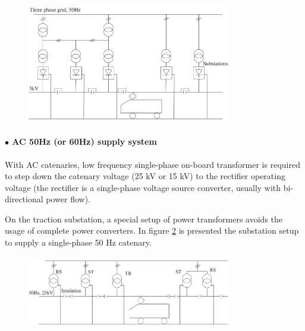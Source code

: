 \begin{figure}[h!]
	\centering
	\begin{minipage}{.7\textwidth}
		\centering
		\includegraphics[width=0.8\textwidth,keepaspectratio]{figures/31.PowerS/abad2016f}
		\label{fig:abad2016f}
	\end{minipage}
\end{figure}




\paragraph{$\bullet$ AC 50Hz (or 60Hz) supply system\\}

With \ac{AC} catenaries, low frequency single-phase on-board transformer is required to step down the catenary voltage (25 kV or 15 kV) to the rectifier operating voltage (the rectifier is a single-phase voltage source converter, usually with bi-directional power flow).

On the traction substation, a special setup of power transformers avoids the usage of complete power converters. In figure \ref{fig:abad2016d} is presented the substation setup to supply a single-phase 50 Hz catenary.

\begin{figure}[h!]
	\centering
	\begin{minipage}{.7\textwidth}
		\centering
		\includegraphics[width=0.8\textwidth,keepaspectratio]{figures/31.PowerS/abad2016d}
		\label{fig:abad2016d}
	\end{minipage}
\end{figure}


